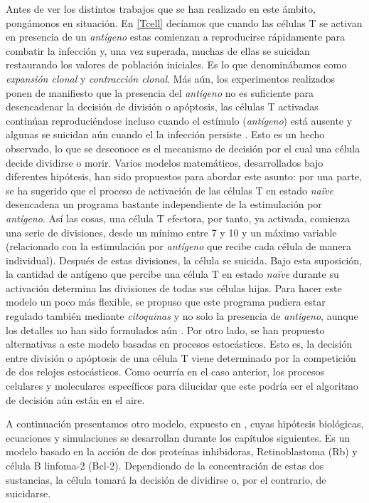 Antes de ver los distintos trabajos que se han realizado en este ámbito, pongámonos en situación. En \ref{Tcell} decíamos que cuando las células T se activan en presencia de un \textit{antígeno} estas comienzan a reproducirse rápidamente para combatir la infección y, una vez superada, muchas de ellas se suicidan restaurando los valores de población iniciales. Es lo que denominábamos como \textit{expansión clonal} y \textit{contracción clonal}. Más aún, los experimentos realizados ponen de manifiesto que la presencia del \textit{antígeno} no es suficiente para desencadenar la decisión de división o apóptosis, las células T activadas continúan reproduciéndose incluso cuando el estímulo (\textit{antígeno}) está ausente y algunas se suicidan aún cuando el la infección persiste \citep{JTB}. Esto es un hecho observado, lo que se desconoce es el mecanismo de decisión por el cual una célula decide dividirse o morir. Varios modelos matemáticos, desarrollados bajo diferentes hipótesis, han sido propuestos para abordar este asunto: por una parte, se ha sugerido que el proceso de activación de las células T en estado \textit{naïve} desencadena un programa bastante independiente de la estimulación por \textit{antígeno}. Así las cosas, una célula T efectora, por tanto, ya activada, comienza una serie de divisiones, desde un mínimo entre 7 y 10 y un máximo variable (relacionado con la estimulación por \textit{antígeno} que recibe cada célula de manera individual). Después de estas divisiones, la célula se suicida. Bajo esta suposición, la cantidad de antígeno que percibe una célula T en estado \textit{naïve} durante su activación determina las divisiones de todas sus células hijas. Para hacer este modelo un poco más flexible, se propuso que este programa pudiera estar regulado también mediante \textit{citoquinas} y no solo la presencia de \textit{antígeno}, aunque los detalles no han sido formulados aún \citep{JTB}. Por otro lado, se han propuesto alternativas a este modelo basadas en procesos estocásticos. Esto es, la decisión entre división o apóptosis de una célula T viene determinado por la competición de dos relojes estocásticos. Como ocurría en el caso anterior, los procesos celulares y moleculares específicos para dilucidar que este podría ser el algoritmo de decisión aún están en el aire. 

A continuación presentamos otro modelo, expuesto en \cite{JTB}, cuyas hipótesis biológicas, ecuaciones y simulaciones se desarrollan durante los capítulos siguientes. Es un modelo basado en la acción de dos proteínas inhibidoras, Retinoblastoma (Rb) y célula B linfoma-2 (Bcl-2). Dependiendo de la concentración de estas dos sustancias, la célula tomará la decisión de dividirse o, por el contrario, de suicidarse.  


